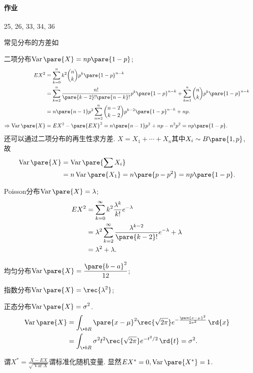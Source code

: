 \documentclass{ctexart}
\DeclareMathOperator{\Var}{Var}
\begin{document}
\paragraph{作业} %
\label{par:作业}

25, 26, 33, 34, 36


\par
常见分布的方差如
\begin{cenum}
    \item 二项分布$\displaystyle \Var\pare{X} = np\pare{1-p}$;
    \begin{align*}
        EX^2 &= \sum_{k=0}^n k^2 \binom{n}{k} p^k \pare{1-p}^{n-k} \\
        &= \sum_{k=2}^n \frac{n!}{\pare{k-2}!\pare{n-k}!} p^k \pare{1-p}^{n-k} + \sum_{k=1}^n \binom{n}{k}p^k\pare{1-p}^{n-k} \\
        &= n\pare{n-1}p^2\sum_{n=2}^n \binom{n-2}{k-2} p^{k-2}\pare{1-p}^{n-k} + np. \\
        \Rightarrow \Var\pare{X} &= EX^2 - \pare{EX}^2 = n\pare{n-1}p^2 + np - n^2p^2 = np\pare{1-p}.
    \end{align*}
    还可以通过二项分布的再生性求方差. $X = X_1 + \cdots + X_n$其中$X_i\sim B\pare{1,p}$, 故
    \begin{align*}
        \Var\pare{X} &= \Var\pare{\sum X_i} \\
        &= n\Var\pare{X_1} = n\pare{p-p^2} = np\pare{1-p}.
    \end{align*}
    \item Poisson分布$\displaystyle \Var\pare{X} = \lambda$;
    \begin{align*}
        EX^2 &= \sum_{k=0}^\infty k^2 \frac{\lambda^k}{k!}e^{-\lambda} \\
        &= \lambda^2 \sum_{k=2}^\infty \frac{\lambda^{k-2}}{\pare{k-2}!}e^{-\lambda} + \lambda \\
        &= \lambda^2 + \lambda.
    \end{align*}
    \item 均匀分布$\displaystyle \Var\pare{X} = \frac{\pare{b-a}^2}{12}$;
    \item 指数分布$\displaystyle \Var\pare{X} = \displaystyle \rec{\lambda^2}$;
    \item 正态分布$\displaystyle \Var\pare{X} = \sigma^2$.
    \begin{align*}
        \Var\pare{X} &= \int_{\+bR} \pare{x-\mu}^2 \rec{\sqrt{2\pi}} e^{-\frac{\pare{x-\mu}^2}{2\sigma^2}}\,\rd{x} \\
        &= \int_{\+bR} \sigma^2 t^2 \rec{\sqrt{2\pi}} e^{-t^2/2}\,\rd{t} = \sigma^2.
    \end{align*}
\end{cenum}
谓$X^* = \displaystyle \frac{X-EX}{\sqrt{\Var{X}}}$谓标准化随机变量. 显然$EX^* = 0, \Var\pare{X^*} = 1$.
\end{document}
